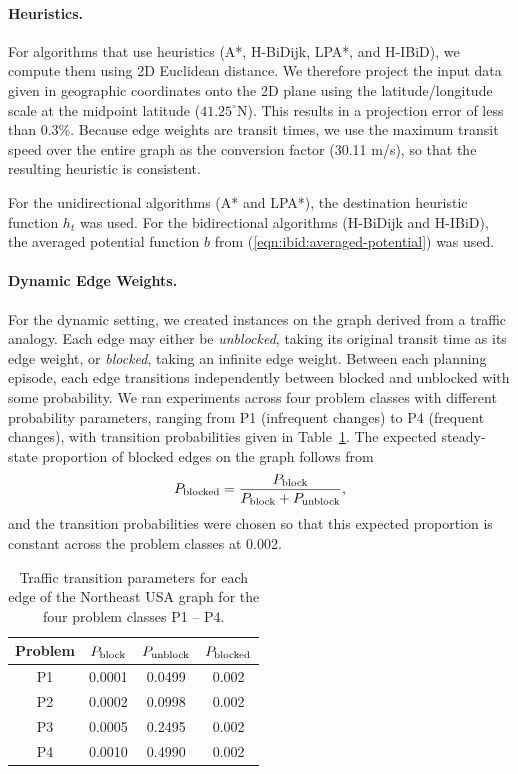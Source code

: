 \paragraph{Heuristics.}
For algorithms that use heuristics (A*, H-BiDijk, LPA*, and H-IBiD),
we compute them using 2D Euclidean distance.
We therefore project the input data given in  geographic coordinates
onto the 2D plane using the latitude/longitude scale at the
midpoint latitude ($41.25^\circ$N).
This results in a projection error of less than 0.3\%.
Because edge weights are transit times,
we use the maximum transit speed over the entire graph as the
conversion factor (30.11 m/s),
so that the resulting heuristic is consistent.

For the unidirectional algorithms (A* and LPA*),
the destination heuristic function $h_t$ was used.
For the bidirectional algorithms (H-BiDijk and H-IBiD),
the averaged potential function $b$
from (\ref{eqn:ibid:averaged-potential}) was used.

\paragraph{Dynamic Edge Weights.}
For the dynamic setting,
we created instances on the graph derived from a traffic analogy.
Each edge may either be \emph{unblocked},
taking its original transit time as its edge weight,
or \emph{blocked}, taking an infinite edge weight.
Between each planning episode,
each edge transitions independently
between blocked and unblocked with some probability.
We ran experiments across four problem classes
with different probability parameters,
ranging from P1 (infrequent changes)
to P4 (frequent changes),
with transition probabilities given
in Table~\ref{table:ibid:traffic-params}.
The expected steady-state proportion of blocked edges on the graph
follows from
\begin{equation}
   P_{\mbox{\scriptsize blocked}} = \frac{P_{\mbox{\scriptsize block}}}{P_{\mbox{\scriptsize block}} + P_{\mbox{\scriptsize unblock}}},
\end{equation}
and the transition probabilities were chosen so that this expected
proportion is constant across the problem classes at 0.002.

\begin{table}
   \centering
   \begin{tabular}{cccc}
      \toprule
      Problem & $P_{\mbox{\scriptsize block}}$ & $P_{\mbox{\scriptsize unblock}}$ & $P_{\mbox{\scriptsize blocked}}$ \\
      \midrule
      P1 & 0.0001 & 0.0499 & 0.002 \\
      P2 & 0.0002 & 0.0998 & 0.002 \\ 
      P3 & 0.0005 & 0.2495 & 0.002 \\
      P4 & 0.0010 & 0.4990 & 0.002 \\
      \bottomrule
   \end{tabular}
   \caption{Traffic transition parameters for each edge
      of the Northeast USA graph for the four problem classes
      P1 -- P4.}
   \label{table:ibid:traffic-params}
\end{table}

